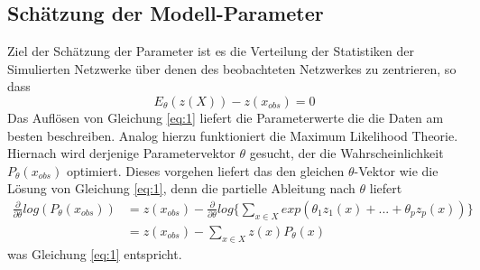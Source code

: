 \documentclass[a4paper,ngerman,oneside,titlepage,bibliography=totoc,11pt]{scrreprt}
\begin{document}
\subsection{Schätzung der Modell-Parameter}
\label{sec:modpar}
Ziel der Schätzung der Parameter ist es die Verteilung der Statistiken der Simulierten Netzwerke über denen des beobachteten Netzwerkes zu zentrieren, so dass
\begin{equation}
	E_\theta(z(X)) - z(x_{obs}) = 0
	\label{eq:1}
\end{equation}
Das Auflösen von Gleichung \ref{eq:1} liefert die Parameterwerte die die Daten am besten beschreiben.
Analog hierzu funktioniert die Maximum Likelihood Theorie. Hiernach wird derjenige Parametervektor $\theta$ gesucht, der die Wahrscheinlichkeit $P_\theta(x_{obs})$ optimiert. Dieses vorgehen liefert das den gleichen $\theta$-Vektor wie die Lösung von Gleichung \ref{eq:1}, denn die partielle Ableitung nach $\theta$ liefert
\begin{align*}
\frac{\partial}{\partial \theta} log(P_\theta(x_{obs})) &= z(x_{obs}) - \frac{\partial}{\partial \theta} log\{\sum_{x \in X}{exp(\theta_1z_1(x)+ ... + \theta_pz_p(x))}\}\\
&=z(x_{obs}) - \sum_{x \in X}{z(x)P_\theta(x)}
\end{align*}
was Gleichung \ref{eq:1} entspricht. 
\end{document}
